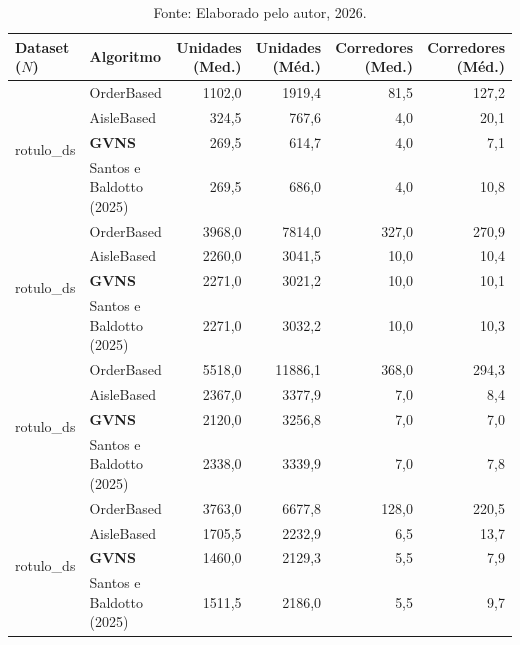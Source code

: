 \begin{table}[htbp]
  \centering
  \caption{\label{tab:estrutura} Decomposição estrutural das soluções: unidades coletadas (numerador) e corredores visitados (denominador), médias de 30 sementes.}
  \begin{tabular}{l l r r r r}
    \toprule
    \textbf{Dataset ($N$)} & \textbf{Algoritmo} & \textbf{Unidades (Med.)} & \textbf{Unidades (Méd.)} & \textbf{Corredores (Med.)} & \textbf{Corredores (Méd.)} \\
    \midrule
    \multirow{4}{*}{{rotulo_ds}} & OrderBased & 1102,0 & 1919,4 & 81,5 & 127,2 \\
     & AisleBased & 324,5 & 767,6 & 4,0 & 20,1 \\
     & \textbf{GVNS} & 269,5 & 614,7 & 4,0 & 7,1 \\
     & Santos e Baldotto (2025) & 269,5 & 686,0 & 4,0 & 10,8 \\
    \midrule
    \multirow{4}{*}{{rotulo_ds}} & OrderBased & 3968,0 & 7814,0 & 327,0 & 270,9 \\
     & AisleBased & 2260,0 & 3041,5 & 10,0 & 10,4 \\
     & \textbf{GVNS} & 2271,0 & 3021,2 & 10,0 & 10,1 \\
     & Santos e Baldotto (2025) & 2271,0 & 3032,2 & 10,0 & 10,3 \\
    \midrule
    \multirow{4}{*}{{rotulo_ds}} & OrderBased & 5518,0 & 11886,1 & 368,0 & 294,3 \\
     & AisleBased & 2367,0 & 3377,9 & 7,0 & 8,4 \\
     & \textbf{GVNS} & 2120,0 & 3256,8 & 7,0 & 7,0 \\
     & Santos e Baldotto (2025) & 2338,0 & 3339,9 & 7,0 & 7,8 \\
    \midrule
    \multirow{4}{*}{{rotulo_ds}} & OrderBased & 3763,0 & 6677,8 & 128,0 & 220,5 \\
     & AisleBased & 1705,5 & 2232,9 & 6,5 & 13,7 \\
     & \textbf{GVNS} & 1460,0 & 2129,3 & 5,5 & 7,9 \\
     & Santos e Baldotto (2025) & 1511,5 & 2186,0 & 5,5 & 9,7 \\
    \bottomrule
  \end{tabular}
  \caption*{\footnotesize Fonte: Elaborado pelo autor, 2026.}
\end{table}
